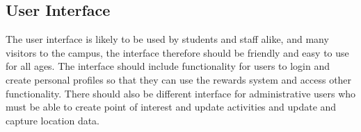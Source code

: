 \documentclass[11pt, a4paper]{article}
\begin{document}
			\subsection{User Interface}
				The user interface is likely to be used by students and staff alike,  and many visitors to the campus,  the interface therefore should be friendly and easy to use for all ages. The interface should include functionality for users to login and create 						personal profiles
				so that they can use the rewards system and access other functionality. There should also be different interface for administrative users who must be able to create point of interest and update activities and update and capture location data.
\end{document}
